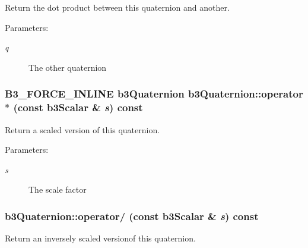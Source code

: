 Return the dot product between this quaternion and another. 

\begin{Desc}
\item[Parameters:]
\begin{description}
\item[{\em q}]The other quaternion \end{description}
\end{Desc}
\hypertarget{classb3_quaternion_ad2b1b2ec07bc16942c47eb5c7750016}{
\subsubsection[operator$\ast$]{\setlength{\rightskip}{0pt plus 5cm}B3\_\-FORCE\_\-INLINE {\bf b3Quaternion} b3Quaternion::operator$\ast$ (const b3Scalar \& {\em s}) const}}
\label{classb3_quaternion_ad2b1b2ec07bc16942c47eb5c7750016}


Return a scaled version of this quaternion. 

\begin{Desc}
\item[Parameters:]
\begin{description}
\item[{\em s}]The scale factor \end{description}
\end{Desc}
\hypertarget{classb3_quaternion_4774d113abff51d66af8cf4da7cccc26}{
\subsubsection[operator/]{ b3Quaternion::operator/ (const b3Scalar \& {\em s}) const}}
\label{classb3_quaternion_4774d113abff51d66af8cf4da7cccc26}


Return an inversely scaled versionof this quaternion. 

